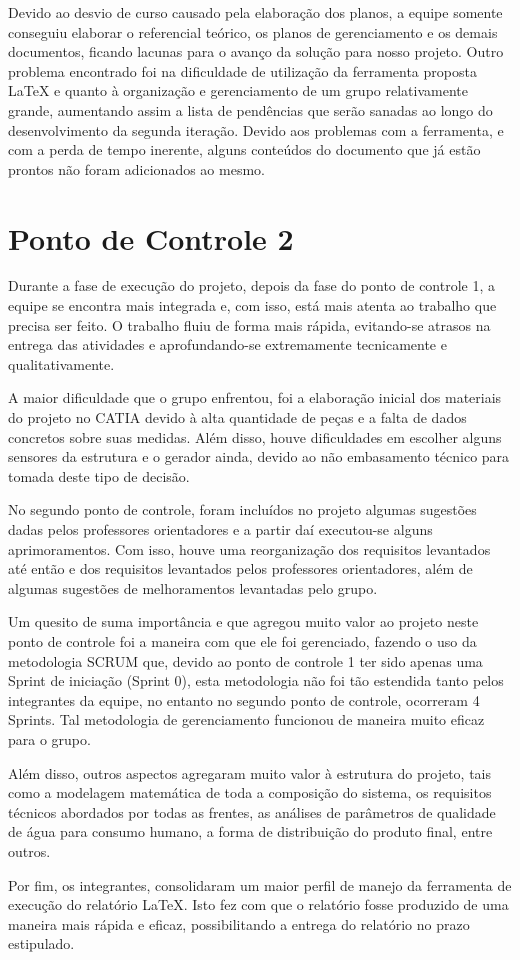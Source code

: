     Devido ao desvio de curso causado pela elaboração dos planos, a equipe somente conseguiu elaborar o referencial
    teórico, os planos de gerenciamento e os demais documentos, ficando lacunas para o avanço da solução 
    para nosso projeto. Outro problema encontrado foi na dificuldade de utilização da ferramenta proposta LaTeX e 
    quanto à organização e gerenciamento de um grupo relativamente grande, aumentando assim a lista de pendências 
    que serão sanadas ao longo do desenvolvimento da segunda iteração. Devido aos problemas com a ferramenta, e com a perda
    de tempo inerente, alguns conteúdos do documento que já estão prontos não foram adicionados ao mesmo.

	\section{Ponto de Controle 2}
	Durante a fase de execução do projeto, depois da fase do ponto de controle 1, a equipe se encontra mais integrada e, com isso, está mais atenta ao trabalho que precisa ser feito. O trabalho fluiu de forma mais rápida, evitando-se atrasos na entrega das atividades e aprofundando-se extremamente tecnicamente e qualitativamente.
	
	A maior dificuldade que o grupo enfrentou, foi a elaboração inicial dos materiais do projeto no CATIA devido à alta quantidade de peças e a falta de dados concretos sobre suas medidas. Além disso, houve dificuldades em escolher alguns sensores da estrutura e o gerador ainda, devido ao  não embasamento técnico para tomada deste tipo de decisão.
	
	No segundo ponto de controle, foram incluídos no projeto algumas sugestões dadas pelos professores orientadores e a partir daí executou-se alguns aprimoramentos. Com isso, houve uma reorganização dos requisitos levantados até então e dos requisitos levantados pelos professores orientadores, além de algumas sugestões de melhoramentos levantadas pelo grupo.
	
	Um quesito de suma importância e que agregou muito valor ao projeto neste ponto de controle foi a maneira com que ele foi gerenciado, fazendo o uso da metodologia SCRUM que, devido ao ponto de controle 1 ter sido apenas uma Sprint  de iniciação (Sprint 0), esta metodologia não foi tão estendida tanto pelos integrantes da equipe, no entanto no segundo ponto de controle, ocorreram 4 Sprints. Tal metodologia de gerenciamento funcionou de maneira muito eficaz para o grupo.
	
	Além disso, outros aspectos agregaram muito valor à estrutura do projeto, tais como a modelagem matemática de toda a composição do sistema, os requisitos técnicos abordados por todas as frentes, as análises de parâmetros de qualidade de água para consumo humano, a forma de distribuição do produto final, entre outros. 
	
	Por fim, os integrantes, consolidaram um maior perfil de manejo da ferramenta de execução do relatório LaTeX. Isto fez com que o relatório fosse produzido de uma maneira mais rápida e eficaz, possibilitando a entrega do relatório no prazo estipulado.